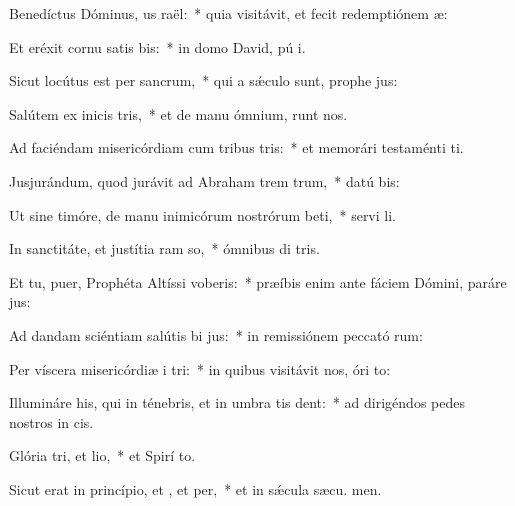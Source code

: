 \item Benedíctus Dóminus, us raël:~* quia visitávit, et fecit redemptiónem  æ:
\item Et eréxit cornu satis bis:~* in domo David, pú i.
\item Sicut locútus est per  sancrum,~* qui a sǽculo sunt, prophe jus:
\item Salútem ex inicis tris,~* et de manu ómnium,  runt nos.
\item Ad faciéndam misericórdiam cum tribus tris:~* et memorári testaménti  ti.
\item Jusjurándum, quod jurávit ad Abraham trem trum,~* datú  bis:
\item Ut sine timóre, de manu inimicórum nostrórum beti,~* servi li.
\item In sanctitáte, et justítia ram so,~* ómnibus di tris.
\item Et tu, puer, Prophéta Altíssi voberis:~* præíbis enim ante fáciem Dómini, paráre  jus:
\item Ad dandam sciéntiam salútis bi jus:~* in remissiónem peccató rum:
\item Per víscera misericórdiæ i tri:~* in quibus visitávit nos, óri  to:
\item Illumináre his, qui in ténebris, et in umbra tis dent:~* ad dirigéndos pedes nostros in  cis.
\item Glória tri, et lio,~* et Spirí to.
\item Sicut erat in princípio, et , et per,~* et in sǽcula sæcu. men.

